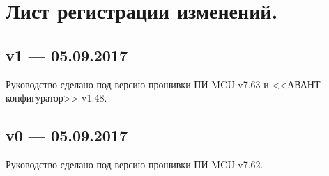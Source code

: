 \section*{ Лист регистрации изменений.}

\subsection*{v1 --- 05.09.2017}

Руководство сделано под версию прошивки ПИ MCU v7.63 и <<АВАНТ-конфигуратор>> v1.48. 

\subsection*{v0 --- 05.09.2017}

Руководство сделано под версию прошивки ПИ MCU v7.62. 